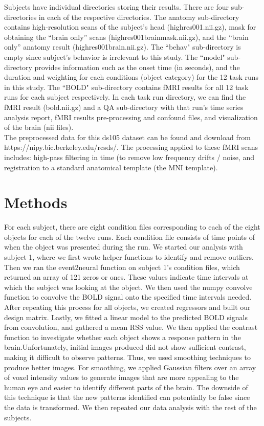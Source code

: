 \documentclass[11pt,twocolumn]{article}
\begin{document}
Subjects have individual directories storing their results. There are four 
sub-directories in each of the respective directories. The anatomy 
sub-directory contains high-resolution scans of the subject's head 
(highres001.nii.gz), mask for obtaining the ``brain only'' scans 
(highres001\textunderscore brain\textunderscore mask.nii.gz), and the 
``brain only'' anatomy result (highres001\textunderscore brain.nii.gz). 
The ``behav" sub-directory is empty since subject's behavior is irrelevant 
to this study. The ``model" sub-directory provides information such as the 
onset time (in seconds), and the duration and weighting for each conditions 
(object category) for the 12 task runs in this study. The ``BOLD" sub-directory 
contains fMRI results for all 12 task runs for each subject respectively. 
In each task run directory, we can find the fMRI result (bold.nii.gz) and 
a QA sub-directory with that run's time series analysis report, fMRI results
pre-processing and confound files, and visualization of the brain 
(nii files).\\ 


The preprocessed data for this ds105 dataset can be found and download from
https://nipy.bic.berkeley.edu/rcsds/. 
The processing applied to these fMRI scans includes: 
high-pass filtering in time (to remove low frequency drifts / noise, 
and registration to a standard anatomical template (the MNI template).\\

\section{Methods}

For each subject, there are eight condition files corresponding 
to each of the eight objects for each of the twelve runs. Each
condition file consists of time points of when the object was presented 
during the run. We started our analysis with subject 1, where we first wrote 
helper functions to identify and remove outliers.  Then we ran 
the event2neural function on subject 1's condition files, which returned an 
array of 121 zeros or ones. These values indicate
time intervals at which the subject was looking at the object.
We then used the numpy convolve function to convolve the BOLD signal 
onto the specified time intervals needed. After repeating this process 
for all objects, we created regressors and built our design matrix. 
Lastly, we fitted a linear model to the predicted BOLD signals 
from convolution, and gathered a mean RSS value. We then applied the contrast
function to investigate whether each object shows a response pattern in the 
brain.Unfortunately, initial images produced did not show sufficient contrast, 
making it difficult to observe patterns. Thus, we used smoothing techniques to 
produce better images. For smoothing, we applied Gaussian filters over an
array of voxel intensity values to generate images that are more appealing
to the human eye and easier to identify different parts of the brain.
The downside of this technique is that the new patterns identified can
potentially be false since the data is transformed. We then repeated our 
data analysis with the rest of the subjects. \\
\end{document}
